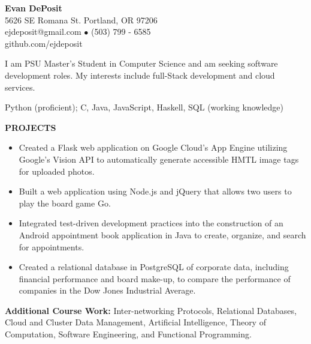 \documentclass[11pt]{article}
\begin{document}
\thispagestyle{empty}
\begin{center}
\noindent \Large{\textbf{Evan DePosit}}\\
\large{5626 SE Romana St. Portland, OR 97206}\\
\large{ejdeposit@gmail.com $\bullet$ (503) 799 - 6585}\\
\large{github.com/ejdeposit}
\end{center}
\medskip
\begin{description}[style=multiline,leftmargin=3.2cm,font=\normalfont]
\item[\textbf{OBJECTIVE:}] I am PSU Master's Student in Computer Science and am seeking software development roles. My interests include full-Stack development and cloud services.
\item[\textbf{LANGUAGES:}] Python (proficient); C, Java, JavaScript, Haskell, SQL (working knowledge)
\end{description}
\noindent
\makebox[0pt][l]{\rule[-.2\baselineskip]{\linewidth}{.3mm}} 
\large{\textbf{PROJECTS}}
\begin{itemize}[leftmargin=*, itemsep=0pt, topsep=5pt]
	\item Created a Flask web application on Google Cloud’s App Engine utilizing Google’s Vision API to automatically generate accessible HMTL image tags for uploaded photos.
	\item Built a web application using Node.js and jQuery that allows two users to play the board game Go.
	\item Integrated test-driven development practices into the construction of an Android appointment book application in Java to create, organize, and search for appointments.
	\item Created a relational database in PostgreSQL of corporate data, including financial performance and board make-up, to compare the performance of companies in the Dow Jones Industrial Average.
\end{itemize} 
\smallskip
\textbf{Additional Course Work:} Inter-networking Protocols,  Relational Databases, Cloud and Cluster Data Management, Artificial Intelligence, Theory of Computation, Software Engineering, and Functional Programming.\bigskip\\
\end{document}
